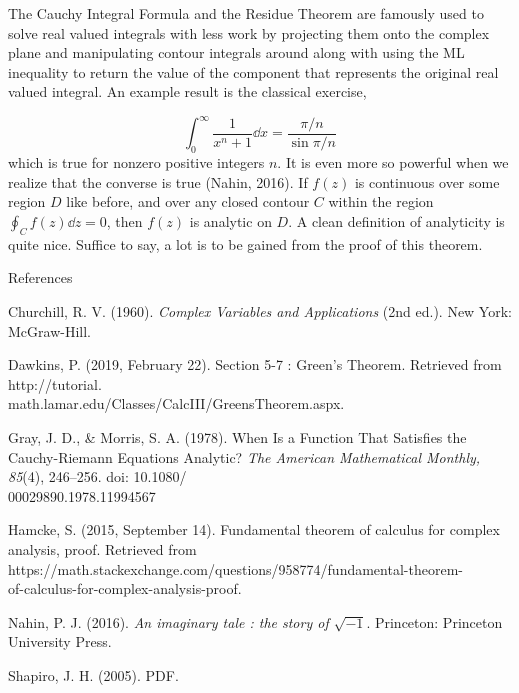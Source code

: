 \documentclass[11pt]{article}
\begin{document}
The Cauchy Integral Formula and the Residue Theorem are famously used to solve real valued integrals with less work by projecting them onto the complex plane and manipulating contour integrals around along with using the ML inequality to return the value of the component that represents the original real valued integral. An example result is the classical exercise,

$$\int_0^\infty \frac{1}{x^n+1}\dd{x} = \frac{\pi / n}{\sin{\pi / n}}$$which is true for nonzero positive integers $n$. It is even more so powerful when we realize that the converse is true (Nahin, 2016). If $f(z)$ is continuous over some region $D$ like before, and over any closed contour $C$ within the region $\displaystyle{\oint_C f(z)\dd{z} = 0}$, then $f(z)$ is analytic on $D$.  A clean definition of analyticity is quite nice. Suffice to say, a lot is to be gained from the proof of this theorem.




\pagebreak

\centerline{References}
\begin{hangparas}{0.5in}{1}
Churchill, R. V. (1960). \textit{Complex Variables and Applications} (2nd ed.). New York: McGraw-Hill.

Dawkins, P. (2019, February 22). Section 5-7 : Green's Theorem. Retrieved from 
http://tutorial.\\math.lamar.edu/Classes/CalcIII/GreensTheorem.aspx.

Gray, J. D., \& Morris, S. A. (1978). When Is a Function That Satisfies the Cauchy-Riemann Equations Analytic? \textit{The American Mathematical Monthly, 85}(4), 246–256. 
doi: 10.1080/\\00029890.1978.11994567

Hamcke, S. (2015, September 14). Fundamental theorem of calculus for complex analysis, proof. Retrieved from https://math.stackexchange.com/questions/958774/fundamental-theorem-\\of-calculus-for-complex-analysis-proof.

Nahin, P. J. (2016). \textit{An imaginary tale : the story of $\sqrt{-1}$}. Princeton: Princeton University Press.

Shapiro, J. H. (2005). PDF.
\end{hangparas}
\end{document}
